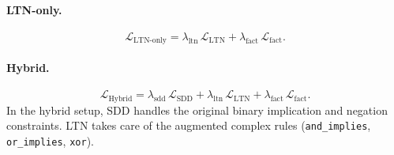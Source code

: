 \documentclass[11pt,a4paper]{article}
\newcommand{\SL}{\mathcal{L}_{\text{SDD}}}
\newcommand{\LTNloss}{\mathcal{L}_{\text{LTN}}}
\newcommand{\Lfact}{\mathcal{L}_{\text{fact}}}
\begin{document}
\paragraph{LTN-only.}
\begin{equation}\label{eq:loss-ltn}
  \mathcal{L}_{\text{LTN-only}}
  = \lambda_{\text{ltn}}\,\LTNloss
  + \lambda_{\text{fact}}\,\Lfact.
\end{equation}

\paragraph{Hybrid.}
\begin{equation}\label{eq:loss-hybrid}
  \mathcal{L}_{\text{Hybrid}}
  = \lambda_{\text{sdd}}\,\SL
  + \lambda_{\text{ltn}}\,\LTNloss
  + \lambda_{\text{fact}}\,\Lfact.
\end{equation}
In the hybrid setup, SDD handles the original binary implication and
negation constraints.  LTN takes care of the augmented complex rules
(\texttt{and\_implies}, \texttt{or\_implies}, \texttt{xor}).
\end{document}
